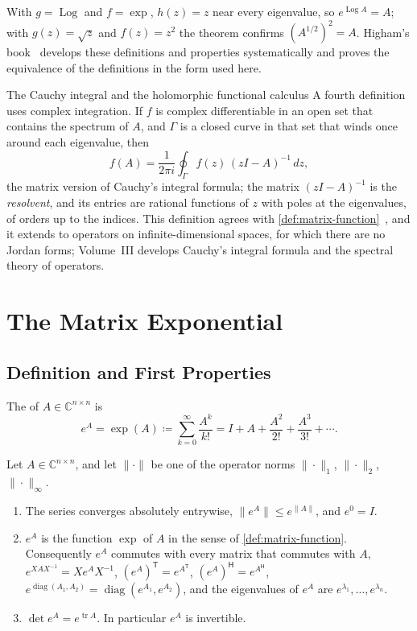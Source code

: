 With $g=\operatorname{Log}$ and $f=\exp$, $h(z)=z$ near every eigenvalue, so $e^{\operatorname{Log}A}=A$; with $g(z)=\sqrt z$ and $f(z)=z^2$ the theorem confirms $(A^{1/2})^2=A$. Higham's book~\cite[Chap.~1]{higham2008} develops these definitions and properties systematically and proves the equivalence of the definitions in the form used here.

\begin{note}{The Cauchy integral and the holomorphic functional calculus}
A fourth definition uses complex integration. If $f$ is complex differentiable in an open set that contains the spectrum of $A$, and $\Gamma$ is a closed curve in that set that winds once around each eigenvalue, then
\[
f(A)=\frac1{2\pi i}\oint_\Gamma f(z)\,(zI-A)^{-1}\,dz ,
\]
the matrix version of Cauchy's integral formula; the matrix $(zI-A)^{-1}$ is the \emph{resolvent}, and its entries are rational functions of $z$ with poles at the eigenvalues, of orders up to the indices. This definition agrees with \cref{def:matrix-function}~\cite[Sect.~1.2.3]{higham2008}, and it extends to operators on infinite-dimensional spaces, for which there are no Jordan forms; Volume~III develops Cauchy's integral formula and the spectral theory of operators.
\end{note}

\section{The Matrix Exponential}
\label{sec:matrix-exponential}

\subsection{Definition and First Properties}

\begin{definition}
\label{def:matrix-exponential}
The  of $A\in\mathbb C^{n\times n}$ is
\[
e^A=\exp(A)\coloneqq\sum_{k=0}^\infty\frac{A^k}{k!}=I+A+\frac{A^2}{2!}+\frac{A^3}{3!}+\cdots.
\]
\end{definition}

\begin{proposition}
\label{prop:exp-basic}
Let $A\in\mathbb C^{n\times n}$, and let $\|\cdot\|$ be one of the operator norms $\|\cdot\|_1$, $\|\cdot\|_2$, $\|\cdot\|_\infty$.
\begin{enumerate}
\item The series converges absolutely entrywise, $\|e^A\|\le e^{\|A\|}$, and $e^0=I$.
\item $e^A$ is the function $\exp$ of $A$ in the sense of \cref{def:matrix-function}. Consequently $e^A$ commutes with every matrix that commutes with $A$, $e^{XAX^{-1}}=Xe^AX^{-1}$, $(e^A)^{\mathsf T}=e^{A^{\mathsf T}}$, $(e^A)^{\mathsf H}=e^{A^{\mathsf H}}$, $e^{\operatorname{diag}(A_1,A_2)}=\operatorname{diag}(e^{A_1},e^{A_2})$, and the eigenvalues of $e^A$ are $e^{\lambda_1},\ldots,e^{\lambda_n}$.
\item $\det e^A=e^{\operatorname{tr}A}$. In particular $e^A$ is invertible.
\end{enumerate}
\end{proposition}


